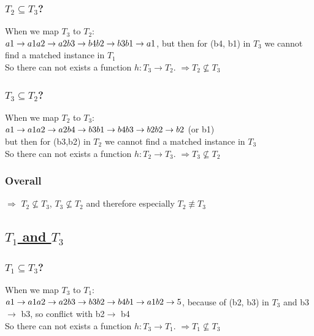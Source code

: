 \documentclass[12pt]{article}
\begin{document}
	\subsubsection*{$T_2 \subseteq T_3$?}
	When we map $T_3$ to $T_2$:\\
	$a1\rightarrow a1\\
	a2\rightarrow a2\\
	b3\rightarrow b4\\
	b2\rightarrow b3\\
	b1\rightarrow a1$, but then for (b4, b1) in $T_3$ we cannot find a matched instance in $T_1$\\
	So there can not exists a function $h: T_3 \rightarrow T_2$. $\Rightarrow T_2 \not\subseteq T_3$	
	
	\subsubsection*{$T_3 \subseteq T_2$?}	
	When we map $T_2$ to $T_3$:\\
	$a1\rightarrow a1\\
	a2\rightarrow a2\\
	b4\rightarrow b3\\
	b1\rightarrow b4\\
	b3\rightarrow b2\\
	b2\rightarrow b2$ (or b1)\\
	but then for (b3,b2) in $T_2$ we cannot find a matched instance in $T_3$\\
	So there can not exists a function $h: T_2 \rightarrow T_3$. $\Rightarrow T_3 \not\subseteq T_2$
	\subsubsection*{Overall}
	$\Rightarrow$ $T_2\not\subseteq T_3$, $T_3 \not\subseteq T_2$ and therefore especially $T_2 \not\equiv T_3$ 

	\subsection*{\underline{$T_1$ and $T_3$}}
	\subsubsection*{$T_1 \subseteq T_3$?}
	When we map $T_3$ to $T_1$:\\
	$a1\rightarrow a1\\
	a2\rightarrow a2\\
	b3\rightarrow b3\\
	b2\rightarrow b4\\
	b1\rightarrow a1\\
	b2\rightarrow 5$, because of (b2, b3) in $T_3$ and b3$\rightarrow$ b3, so conflict with b2$\rightarrow$ b4 \\
	So there can not exists a function $h: T_3 \rightarrow T_1$. $\Rightarrow T_1 \not\subseteq T_3$
\end{document}
